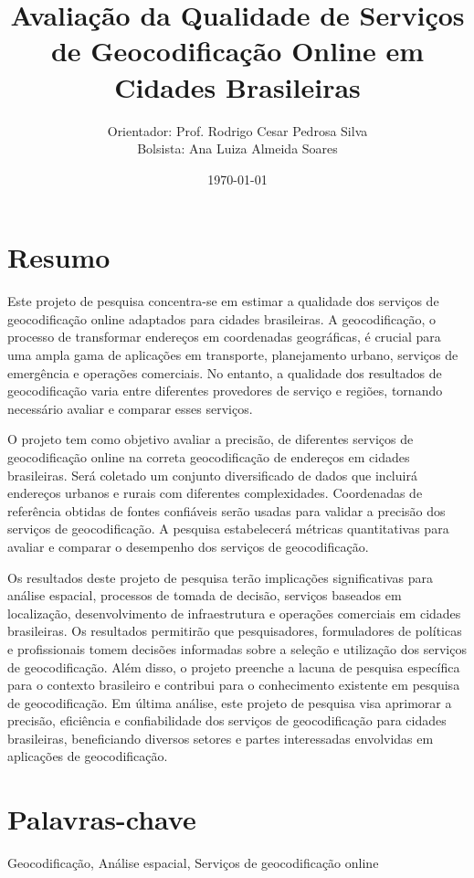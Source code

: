 \documentclass{article}
\title{Avaliação da Qualidade de Serviços de Geocodificação Online em Cidades Brasileiras}
\author{Orientador: Prof. Rodrigo Cesar Pedrosa Silva \\
Bolsista: Ana Luiza Almeida Soares}
\date{\today}
\begin{document}
\maketitle

\section{Resumo}
Este projeto de pesquisa concentra-se em estimar a qualidade dos serviços de geocodificação online adaptados para cidades brasileiras. A geocodificação, o processo de transformar endereços em coordenadas geográficas, é crucial para uma ampla gama de aplicações em transporte, planejamento urbano, serviços de emergência e operações comerciais. No entanto, a qualidade dos resultados de geocodificação varia entre diferentes provedores de serviço e regiões, tornando necessário avaliar e comparar esses serviços.

O projeto tem como objetivo avaliar a precisão, de diferentes serviços de geocodificação online na correta geocodificação de endereços em cidades brasileiras. Será coletado um conjunto diversificado de dados que incluirá endereços urbanos e rurais com diferentes complexidades. Coordenadas de referência obtidas de fontes confiáveis serão usadas para validar a precisão dos serviços de geocodificação. A pesquisa estabelecerá métricas quantitativas para avaliar e comparar o desempenho dos serviços de geocodificação.

Os resultados deste projeto de pesquisa terão implicações significativas para análise espacial, processos de tomada de decisão, serviços baseados em localização, desenvolvimento de infraestrutura e operações comerciais em cidades brasileiras. Os resultados permitirão que pesquisadores, formuladores de políticas e profissionais tomem decisões informadas sobre a seleção e utilização dos serviços de geocodificação. Além disso, o projeto preenche a lacuna de pesquisa específica para o contexto brasileiro e contribui para o conhecimento existente em pesquisa de geocodificação. Em última análise, este projeto de pesquisa visa aprimorar a precisão, eficiência e confiabilidade dos serviços de geocodificação para cidades brasileiras, beneficiando diversos setores e partes interessadas envolvidas em aplicações de geocodificação.
   
\section{Palavras-chave}
Geocodificação, Análise espacial, Serviços de geocodificação online
   
\end{document}
